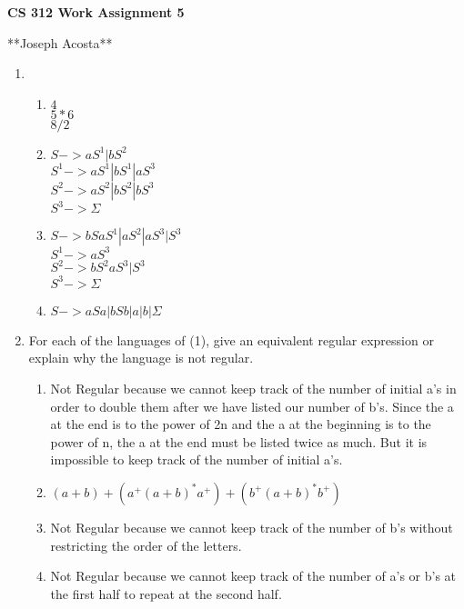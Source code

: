 \documentclass[11pt]{article}
\begin{document}
\begin{center}             %
\begin{LARGE}
{\bf CS 312 Work Assignment 5}
\end{LARGE}
\vskip 0.25cm      %

**Joseph Acosta**\\
\end{center}

\begin{enumerate}

\item
\begin{enumerate}
\item $4$\\
	  $5*6$\\
	  $8/2$\\
\item $S->    aS^1|bS^2$\\
	  $S^1->  aS^1|bS^1|aS^3$\\
	  $S^2->  aS^2|bS^2|bS^3$\\
	  $S^3->  \Sigma$\\
\item $S->	  bSaS^1|aS^2|aS^3|S^3$\\
	  $S^1->  aS^3$\\
	  $S^2->  bS^2aS^3|S^3$\\
	  $S^3->  \Sigma$\\
\item $S-> aSa|bSb|a|b|\Sigma$\\
\end{enumerate}

\item For each of the languages of (1), give an equivalent regular expression or explain
why the language is not regular.
\begin{enumerate}
\item Not Regular because we cannot keep track of the number of initial a's in order to double them after we have listed our number of b's. Since the a at the end is to the power of 2n and the a at the beginning is to the power of n, the a at the end must be listed twice as much. But it is impossible to keep track of the number of initial a's.\\
\item $(a+b)+(a^+(a+b)^*a^+)+(b^+(a+b)^*b^+)$\\
\item Not Regular because we cannot keep track of the number of b's without restricting the order of the letters.\\
\item Not Regular because we cannot keep track of the number of a's or b's at the first half to repeat at the second half.\\
\end{enumerate}


\end{enumerate}
\end{document}
